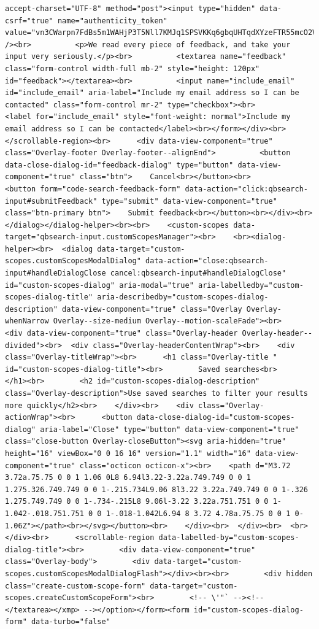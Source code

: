 \documentclass[
  letterpaper,
]{book}
\begin{document}
\begin{verbatim}
accept-charset="UTF-8" method="post"><input type="hidden" data-csrf="true" name="authenticity_token" value="vn3CWarpn7FdBs5m1WAHjP3T5Nll7KMJq1SPSVKKq6gbqUHTqdXYzeFTR55mcO2V/WSTOTrDtkksieJL5aJPsg==" /><br>          <p>We read every piece of feedback, and take your input very seriously.</p><br>          <textarea name="feedback" class="form-control width-full mb-2" style="height: 120px" id="feedback"></textarea><br>          <input name="include_email" id="include_email" aria-label="Include my email address so I can be contacted" class="form-control mr-2" type="checkbox"><br>          <label for="include_email" style="font-weight: normal">Include my email address so I can be contacted</label><br></form></div><br>      </scrollable-region><br>      <div data-view-component="true" class="Overlay-footer Overlay-footer--alignEnd">          <button data-close-dialog-id="feedback-dialog" type="button" data-view-component="true" class="btn">    Cancel<br></button><br>          <button form="code-search-feedback-form" data-action="click:qbsearch-input#submitFeedback" type="submit" data-view-component="true" class="btn-primary btn">    Submit feedback<br></button><br></div><br></dialog></dialog-helper><br><br>    <custom-scopes data-target="qbsearch-input.customScopesManager"><br>    <br><dialog-helper><br>  <dialog data-target="custom-scopes.customScopesModalDialog" data-action="close:qbsearch-input#handleDialogClose cancel:qbsearch-input#handleDialogClose" id="custom-scopes-dialog" aria-modal="true" aria-labelledby="custom-scopes-dialog-title" aria-describedby="custom-scopes-dialog-description" data-view-component="true" class="Overlay Overlay-whenNarrow Overlay--size-medium Overlay--motion-scaleFade"><br>    <div data-view-component="true" class="Overlay-header Overlay-header--divided"><br>  <div class="Overlay-headerContentWrap"><br>    <div class="Overlay-titleWrap"><br>      <h1 class="Overlay-title " id="custom-scopes-dialog-title"><br>        Saved searches<br>      </h1><br>        <h2 id="custom-scopes-dialog-description" class="Overlay-description">Use saved searches to filter your results more quickly</h2><br>    </div><br>    <div class="Overlay-actionWrap"><br>      <button data-close-dialog-id="custom-scopes-dialog" aria-label="Close" type="button" data-view-component="true" class="close-button Overlay-closeButton"><svg aria-hidden="true" height="16" viewBox="0 0 16 16" version="1.1" width="16" data-view-component="true" class="octicon octicon-x"><br>    <path d="M3.72 3.72a.75.75 0 0 1 1.06 0L8 6.94l3.22-3.22a.749.749 0 0 1 1.275.326.749.749 0 0 1-.215.734L9.06 8l3.22 3.22a.749.749 0 0 1-.326 1.275.749.749 0 0 1-.734-.215L8 9.06l-3.22 3.22a.751.751 0 0 1-1.042-.018.751.751 0 0 1-.018-1.042L6.94 8 3.72 4.78a.75.75 0 0 1 0-1.06Z"></path><br></svg></button><br>    </div><br>  </div><br>  <br></div><br>      <scrollable-region data-labelled-by="custom-scopes-dialog-title"><br>        <div data-view-component="true" class="Overlay-body">        <div data-target="custom-scopes.customScopesModalDialogFlash"></div><br><br>        <div hidden class="create-custom-scope-form" data-target="custom-scopes.createCustomScopeForm"><br>        <!-- \'"` --><!-- </textarea></xmp> --></option></form><form id="custom-scopes-dialog-form" data-turbo="false" 
\end{verbatim}
\end{document}
